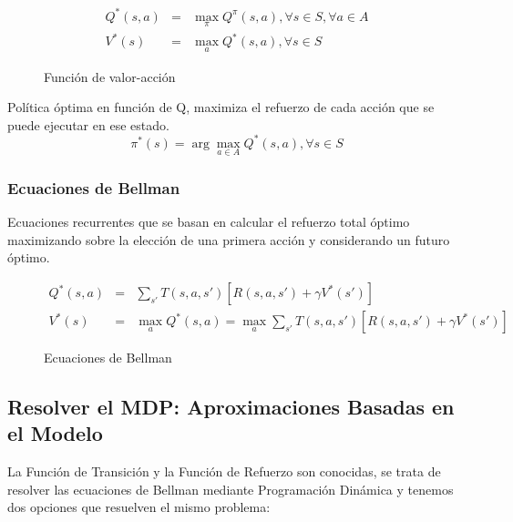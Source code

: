 \documentclass[12pt, twoside, openright]{report} %
\begin{document}
\begin{figure}[H]
	\begin{eqnarray*}
		Q^* (s, a) &=& \max_\pi Q^\pi (s, a), \forall s \in S, \forall a \in A \\
		V^* (s) &=& \max_a Q^* (s, a), \forall s \in S
	\end{eqnarray*}
	\captionsetup{justification=centering}
	\caption{Función de valor-acción}
\end{figure}

Política óptima en función de Q, maximiza el refuerzo de cada acción que se puede ejecutar en ese estado.
$$\pi^* (s) = \arg \max_{a \in A} Q^* (s,a), \forall s \in S$$
\pagebreak
\subsubsection{Ecuaciones de Bellman}
Ecuaciones recurrentes que se basan en calcular el refuerzo total óptimo maximizando sobre la elección de una primera acción y considerando un futuro óptimo.
\begin{figure}[H]
	\begin{eqnarray*}
		Q^* (s, a) &=& \sum _{s'} T(s, a, s') [R(s, a, s') + \gamma V^* (s')]\\
		V^* (s) &=& \max_a Q^*(s, a) = \max _a \sum _{s'} T(s, a, s') [R(s, a, s') + \gamma V^* (s')]
	\end{eqnarray*}
	\captionsetup{justification=centering}
	\caption{Ecuaciones de Bellman}
\end{figure}

\subsection{Resolver el MDP: Aproximaciones Basadas en el Modelo}
La Función de Transición y la Función de Refuerzo son conocidas, se trata de resolver las ecuaciones de Bellman mediante Programación Dinámica y tenemos dos opciones que resuelven el mismo problema:
\end{document}
